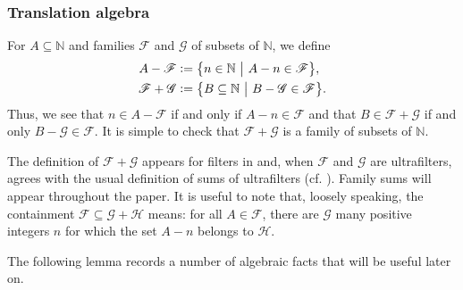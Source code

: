 \documentclass[letter,11pt]{article}
\theoremstyle{plain}
\theoremstyle{definition}
\theoremstyle{plain}
\theoremstyle{plain}
\numberwithin{equation}{section}
\newcommand{\N}{\mathbb{N}}
\newcommand{\defeq}{\vcentcolon=}
\newcommand{\family}{\mathscr{F}}
\newcommand{\familyone}{\mathscr{F}}
\newcommand{\familytwo}{\mathscr{G}}
\newcommand{\familythree}{\mathscr{H}}
\begin{document}
\subsubsection{Translation algebra}
\label{sec_family_algebra}

For $A \subseteq \N$ and families $\family$ and $\familytwo$ of subsets of $\N$, we define
\begin{align*}
    A - \family &\defeq \big\{ n \in \N \ \big| \ A-n \in \family \big\},\\
    \familyone + \familytwo &\defeq \big\{ B \subseteq \N \ \big| \ B - \familytwo \in \family \big\}.
\end{align*}
Thus, we see that $n \in A - \family$ if and only if $A - n \in \family$ and that $B \in \family + \familytwo$ if and only $B - \familytwo \in \family$.  It is simple to check that $\family + \familytwo$ is a family of subsets of $\N$.

The definition of $\family + \familytwo$ appears for filters in \cite{berglund_hindman_1984,papazyan_1989} and, when $\family$ and $\familytwo$ are ultrafilters, agrees with the usual definition of sums of ultrafilters (cf. \cite[Thm. 4.12]{hindman_strauss_book_2012}).  Family sums will appear throughout the paper.  It is useful to note that, loosely speaking, the containment $\family \subseteq \familytwo + \familythree$ means: for all $A \in \family$, there are $\familytwo$ many positive integers $n$ for which the set $A-n$ belongs to $\familythree$.

The following lemma records a number of algebraic facts that will be useful later on.
\end{document}
